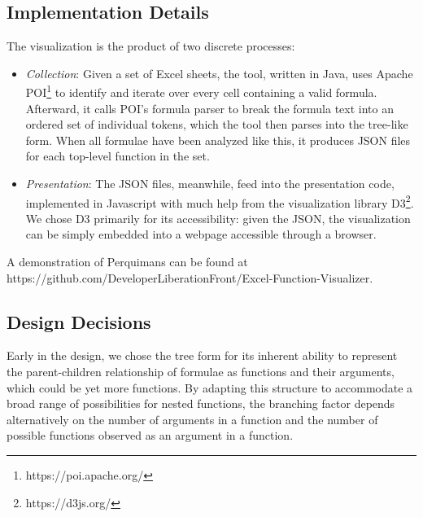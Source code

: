 \documentclass[conference]{IEEEtran}
\newcommand{\toolname}{Perquimans } \newcommand{\toolnameend}{Perquimans}
\begin{document}
	\subsection{Implementation Details} The visualization is the product of two
	discrete processes: \begin{itemize} \item \textit{Collection}: Given a set of
		Excel sheets, the tool, written in Java, uses Apache
		POI\footnote{https://poi.apache.org/} to identify and iterate over every cell
		containing a valid formula. Afterward, it calls POI's formula parser to break
		the formula text into an ordered set of individual tokens, which the tool then
		parses into the tree-like form. When all formulae have been analyzed like this,
		it produces JSON files for each top-level function in the set.
		
		\item \textit{Presentation}: The JSON files, meanwhile, feed into the
		presentation code, implemented in Javascript with much help from the
		visualization library D3\footnote{https://d3js.org/}. We chose D3 primarily
		for its accessibility: given the JSON, the visualization can be simply
		embedded into a webpage accessible through a browser. \end{itemize} A
	demonstration of \toolname can be found at
	https://github.com/DeveloperLiberationFront/Excel-Function-Visualizer.
	
	\subsection{Design Decisions} \label{ssec:decisions} Early in the design, we
	chose the tree form for its inherent ability to represent the parent-children
	relationship of formulae as functions and their arguments, which could be yet
	more functions. By adapting this structure to accommodate a broad range of
	possibilities for nested functions, the branching factor depends alternatively
	on the number of arguments in a function and the number of possible functions
	observed as an argument in a function. \par
	
\end{document}
